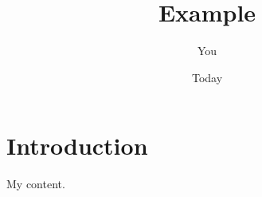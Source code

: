 \documentclass{article}
\title{Example}
\author{You}
\date{Today}
\begin{document}
\maketitle

\section{Introduction}
My content.
\end{document}
